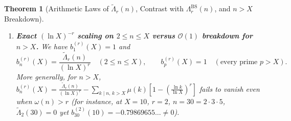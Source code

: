 \documentclass[11pt,reqno]{amsart}
\newtheorem{theorem}{Theorem}[section]
\theoremstyle{definition}
\theoremstyle{remark}
\numberwithin{equation}{section}
\DeclareMathOperator{\rad}{rad}
\begin{document}
\begin{theorem}[Arithmetic Laws of $\widetilde{\Lambda}_r(n)$, Contrast with $\Lambda_r^{\mathrm{BS}}(n)$, and $n > X$ Breakdown]
\begin{enumerate}[label=\textup{(\roman*)},leftmargin=2.2em]
\begin{equation}
\begin{aligned}
&\le \bigl(\ln\rad(n)\bigr)^r,
\end{aligned}
\end{equation}
and as $x \to \infty$, $\sum_{n \le x,\, \omega(n)=m} \lvert\widetilde{\Lambda}_r(n)\rvert \sim \frac{1}{\Gamma(r)}\bigl[\begin{smallmatrix} r \\ m \end{smallmatrix}\bigr]x(\ln x)^{r-1}$ and $\sum_{n \le x} \lvert\widetilde{\Lambda}_r(n)\rvert \sim r\,x(\ln x)^{r-1}$, where $\bigl[\begin{smallmatrix} r \\ m \end{smallmatrix}\bigr]$ denotes the unsigned Stirling number of the first kind.
\item \textbf{Exact $(\ln X)^{-r}$ scaling on $2 \le n \le X$ versus $\mathcal{O}(1)$ breakdown for $n > X$.} We have $b_1^{(r)}(X) = 1$ and
\begin{equation}\label{eq:bn_piecewise}
b_n^{(r)}(X) = \frac{\widetilde{\Lambda}_r(n)}{(\ln X)^r} \quad (2 \le n \le X), \qquad b_p^{(r)}(X) = 1 \quad (\text{every prime } p > X).
\end{equation}
More generally, for $n > X$, $b_n^{(r)}(X) = \frac{\widetilde{\Lambda}_r(n)}{(\ln X)^r} - \sum_{k \mid n,\, k > X}\mu(k)[1 - (\frac{\ln k}{\ln X})^r]$ fails to vanish even when $\omega(n) > r$ (for instance, at $X = 10$, $r = 2$, $n = 30 = 2\cdot 3\cdot 5$, $\widetilde{\Lambda}_2(30) = 0$ yet $b_{30}^{(2)}(10) = -0.79869655\dots \neq 0$).
\end{enumerate}
\end{theorem}
\end{document}
